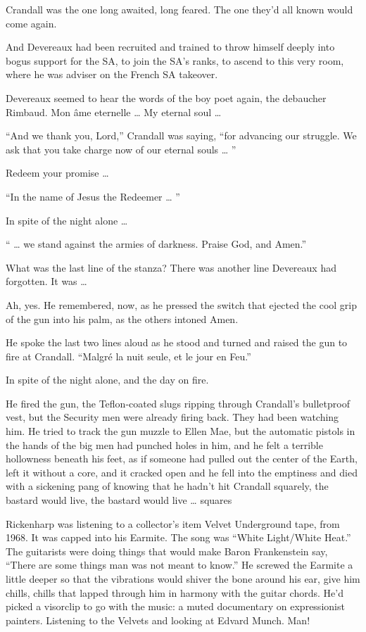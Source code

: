 Crandall was the one long awaited, long feared. The one they’d all known would come again.

And Devereaux had been recruited and trained to throw himself deeply into bogus support for the SA, to join the SA’s ranks, to ascend to this very room, where he was adviser on the French SA takeover.

Devereaux seemed to hear the words of the boy poet again, the debaucher Rimbaud. Mon âme eternelle … My eternal soul …

“And we thank you, Lord,” Crandall was saying, “for advancing our struggle. We ask that you take charge now of our eternal souls … ”

Redeem your promise …

“In the name of Jesus the Redeemer … ”

In spite of the night alone …

“ … we stand against the armies of darkness. Praise God, and Amen.”

What was the last line of the stanza? There was another line Devereaux had forgotten. It was …

Ah, yes. He remembered, now, as he pressed the switch that ejected the cool grip of the gun into his palm, as the others intoned Amen.

He spoke the last two lines aloud as he stood and turned and raised the gun to fire at Crandall. “Malgré la nuit seule, et le jour en Feu.”

In spite of the night alone, and the day on fire.

He fired the gun, the Teflon-coated slugs ripping through Crandall’s bulletproof vest, but the Security men were already firing back. They had been watching him. He tried to track the gun muzzle to Ellen Mae, but the automatic pistols in the hands of the big men had punched holes in him, and he felt a terrible hollowness beneath his feet, as if someone had pulled out the center of the Earth, left it without a core, and it cracked open and he fell into the emptiness and died with a sickening pang of knowing that he hadn’t hit Crandall squarely, the bastard would live, the bastard would live …
squares

Rickenharp was listening to a collector’s item Velvet Underground tape, from 1968. It was capped into his Earmite. The song was “White Light/White Heat.” The guitarists were doing things that would make Baron Frankenstein say, “There are some things man was not meant to know.” He screwed the Earmite a little deeper so that the vibrations would shiver the bone around his ear, give him chills, chills that lapped through him in harmony with the guitar chords. He’d picked a visorclip to go with the music: a muted documentary on expressionist painters. Listening to the Velvets and looking at Edvard Munch. Man!

